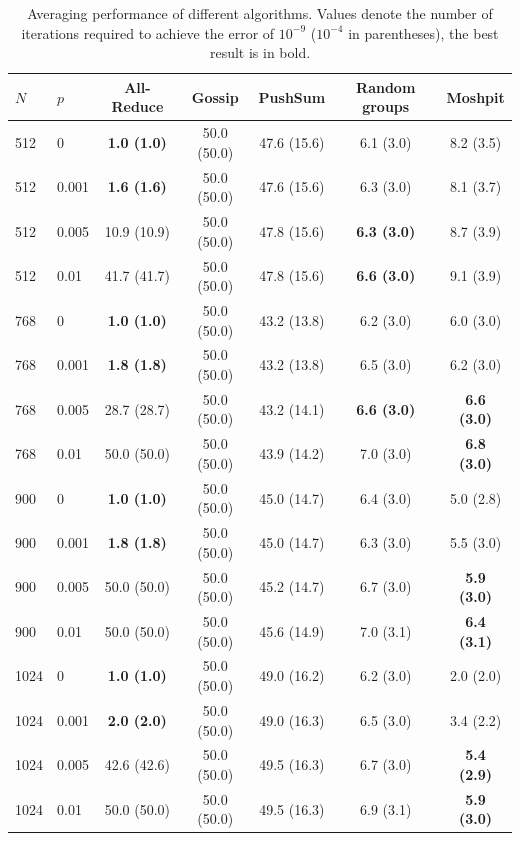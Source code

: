 \begin{table}[ht]
\centering
\caption{Averaging performance of different algorithms. Values denote the number of iterations required to achieve the error of $10^{-9}$ ($10^{-4}$ in parentheses), the best result is in bold.}
\vspace{1em}
\label{tab:full_averaging}
\begin{tabular}{@{}llccccc@{}}
\toprule
$N$  & $p$   & All-Reduce  & Gossip      & PushSum     & Random groups & Moshpit   \\ \midrule
512  & 0     & \bf 1.0 (1.0)   & 50.0 (50.0) & 47.6 (15.6) & 6.1 (3.0)     & 8.2 (3.5) \\
512  & 0.001 & \bf 1.6 (1.6)   & 50.0 (50.0) & 47.6 (15.6) & 6.3 (3.0)     & 8.1 (3.7) \\
512  & 0.005 & 10.9 (10.9) & 50.0 (50.0) & 47.8 (15.6) & \bf 6.3 (3.0)     & 8.7 (3.9) \\
512  & 0.01  & 41.7 (41.7) & 50.0 (50.0) & 47.8 (15.6) & \bf 6.6 (3.0)     & 9.1 (3.9) \\ \midrule
768  & 0     & \bf 1.0 (1.0)   & 50.0 (50.0) & 43.2 (13.8) & 6.2 (3.0)     & 6.0 (3.0) \\
768  & 0.001 & \bf 1.8 (1.8)   & 50.0 (50.0) & 43.2 (13.8) & 6.5 (3.0)     & 6.2 (3.0) \\
768  & 0.005 & 28.7 (28.7) & 50.0 (50.0) & 43.2 (14.1) & \bf 6.6 (3.0)     & \bf 6.6 (3.0) \\
768  & 0.01  & 50.0 (50.0) & 50.0 (50.0) & 43.9 (14.2) & 7.0 (3.0)     & \bf 6.8 (3.0) \\ \midrule
900  & 0     & \bf 1.0 (1.0)   & 50.0 (50.0) & 45.0 (14.7) & 6.4 (3.0)     & 5.0 (2.8) \\
900  & 0.001 & \bf 1.8 (1.8)   & 50.0 (50.0) & 45.0 (14.7) & 6.3 (3.0)     & 5.5 (3.0) \\
900  & 0.005 & 50.0 (50.0) & 50.0 (50.0) & 45.2 (14.7) & 6.7 (3.0)     &\bf  5.9 (3.0) \\
900  & 0.01  & 50.0 (50.0) & 50.0 (50.0) & 45.6 (14.9) & 7.0 (3.1)     & \bf 6.4 (3.1) \\ \midrule
1024 & 0     & \bf 1.0 (1.0)   & 50.0 (50.0) & 49.0 (16.2) & 6.2 (3.0)     & 2.0 (2.0) \\
1024 & 0.001 & \bf 2.0 (2.0)   & 50.0 (50.0) & 49.0 (16.3) & 6.5 (3.0)     & 3.4 (2.2) \\
1024 & 0.005 & 42.6 (42.6) & 50.0 (50.0) & 49.5 (16.3) & 6.7 (3.0)     & \bf 5.4 (2.9) \\
1024 & 0.01  & 50.0 (50.0) & 50.0 (50.0) & 49.5 (16.3) & 6.9 (3.1)     & \bf 5.9 (3.0) \\ \bottomrule
\end{tabular}
\end{table}

